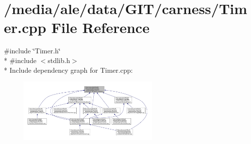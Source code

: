 \hypertarget{a00088}{\section{/media/ale/data/\-G\-I\-T/carness/\-Timer.cpp File Reference}
\label{a00088}
}
{\ttfamily \#include \char`\"{}Timer.\-h\char`\"{}}\\*
{\ttfamily \#include $<$stdlib.\-h$>$}\\*
Include dependency graph for Timer.\-cpp\-:\nopagebreak
\begin{figure}[H]
\begin{center}
\leavevmode
\includegraphics[width=199pt]{a00163}
\end{center}
\end{figure}
